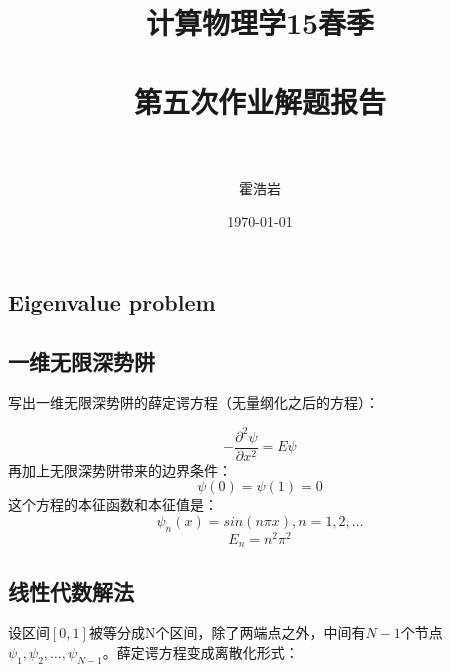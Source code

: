 \documentclass[paper=a4, fontsize=11pt]{scrartcl} %
\title{
\normalfont \normalsize 
\textsc{计算物理学15春季} \\ [25pt] %
\horrule{0.5pt} \\[0.4cm] %
\huge 第五次作业解题报告 \\ %
\horrule{2pt} \\[0.5cm] %
}
\author{霍浩岩} %
\date{\normalsize\today} %
\numberwithin{equation}{section} %
\numberwithin{figure}{section} %
\numberwithin{table}{section} %
\begin{document}
\begin{CJK*}{UTF8}{gbsn}

\maketitle %


\section{Eigenvalue problem}
\subsection{一维无限深势阱}
写出一维无限深势阱的薛定谔方程（无量纲化之后的方程）：

\begin{equation}
-\frac{\partial^2 \psi}{\partial x^2} = E \psi
\end{equation}
再加上无限深势阱带来的边界条件：
\begin{equation}
\psi(0) = \psi(1) = 0
\end{equation}
这个方程的本征函数和本征值是：
\begin{equation}
\psi_n(x) = sin(n\pi x), n=1, 2, \dots
\end{equation}
\begin{equation}
E_n = n^2\pi^2
\end{equation}

\subsection{线性代数解法}
设区间$[0, 1]$被等分成N个区间，除了两端点之外，中间有$N-1$个节点$\psi_1, \psi_2, \dots, \psi_{N-1}$。薛定谔方程变成离散化形式：


\end{CJK*}
\end{document}
